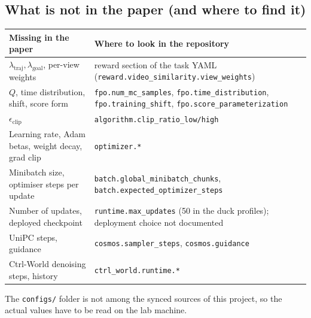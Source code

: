 \documentclass[11pt,a4paper]{article}
\theoremstyle{remark}
\begin{document}
\subsection{What is not in the paper (and where to find it)}
\begin{center}
\small
\begin{tabularx}{\linewidth}{@{}l Y@{}}
\toprule
Missing in the paper & Where to look in the repository\\
\midrule
$\lambda_{\mathrm{traj}},\lambda_{\mathrm{goal}}$, per-view weights & reward section of the task YAML (\texttt{reward.video\_similarity.view\_weights})\\
$Q$, time distribution, shift, score form & \texttt{fpo.num\_mc\_samples}, \texttt{fpo.time\_distribution}, \texttt{fpo.training\_shift}, \texttt{fpo.score\_parameterization}\\
$\epsilon_{\mathrm{clip}}$ & \texttt{algorithm.clip\_ratio\_low/high}\\
Learning rate, Adam betas, weight decay, grad clip & \texttt{optimizer.*}\\
Minibatch size, optimiser steps per update & \texttt{batch.global\_minibatch\_chunks}, \texttt{batch.expected\_optimizer\_steps}\\
Number of updates, deployed checkpoint & \texttt{runtime.max\_updates} (50 in the duck profiles); deployment choice not documented\\
UniPC steps, guidance & \texttt{cosmos.sampler\_steps}, \texttt{cosmos.guidance}\\
Ctrl-World denoising steps, history & \texttt{ctrl\_world.runtime.*}\\
\bottomrule
\end{tabularx}
\end{center}
The \texttt{configs/} folder is not among the synced sources of this project, so the actual values have to be read on the lab machine.

\end{document}
